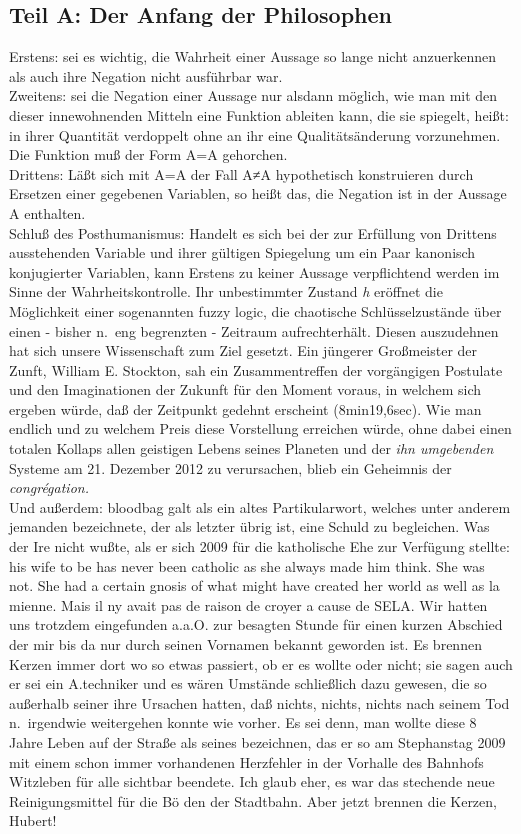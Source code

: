 \documentclass[
]{article}
\author{}
\date{\vspace{-2.5em}}
\begin{document}
\subsection{Teil A: Der Anfang der
Philosophen}\label{teil-a-der-anfang-der-philosophen}

Erstens: sei es wichtig, die Wahrheit einer Aussage so lange nicht
anzuerkennen als auch ihre Negation nicht ausführbar war.\\
Zweitens: sei die Negation einer Aussage nur alsdann möglich, wie man
mit den dieser innewohnenden Mitteln eine Funktion ableiten kann, die
sie spiegelt, heißt: in ihrer Quantität verdoppelt ohne an ihr eine
Qualitätsänderung vorzunehmen. Die Funktion muß der Form A=A
gehorchen.\\
Drittens: Läßt sich mit A=A der Fall A≠A hypothetisch konstruieren durch
Ersetzen einer gegebenen Variablen, so heißt das, die Negation ist in
der Aussage A enthalten.\\
Schluß des Posthumanismus: Handelt es sich bei der zur Erfüllung von
Drittens ausstehenden Variable und ihrer gültigen Spiegelung um ein Paar
kanonisch konjugierter Variablen, kann Erstens zu keiner Aussage
verpflichtend werden im Sinne der Wahrheitskontrolle. Ihr unbestimmter
Zustand \emph{h} eröffnet die Möglichkeit einer sogenannten fuzzy logic,
die chaotische Schlüsselzustände über einen - bisher n.~eng begrenzten -
Zeitraum aufrechterhält. Diesen auszudehnen hat sich unsere Wissenschaft
zum Ziel gesetzt. Ein jüngerer Großmeister der Zunft, William E.
Stockton, sah ein Zusammentreffen der vorgängigen Postulate und den
Imaginationen der Zukunft für den Moment voraus, in welchem sich ergeben
würde, daß der Zeitpunkt gedehnt erscheint (8min19,6sec). Wie man
endlich und zu welchem Preis diese Vorstellung erreichen würde, ohne
dabei einen totalen Kollaps allen geistigen Lebens seines Planeten und
der \emph{ihn umgebenden} Systeme am 21. Dezember 2012 zu verursachen,
blieb ein Geheimnis der \emph{congrégation.}\\
Und außerdem: bloodbag galt als ein altes Partikularwort, welches unter
anderem jemanden bezeichnete, der als letzter übrig ist, eine Schuld zu
begleichen. Was der Ire nicht wußte, als er sich 2009 für die
katholische Ehe zur Verfügung stellte: his wife to be has never been
catholic as she always made him think. She was not. She had a certain
gnosis of what might have created her world as well as la mienne. Mais
il n\textquotesingle y avait pas de raison de croyer a cause de SELA.
Wir hatten uns trotzdem eingefunden a.a.O. zur besagten Stunde für einen
kurzen Abschied der mir bis da nur durch seinen Vornamen bekannt
geworden ist. Es brennen Kerzen immer dort wo so etwas passiert, ob er
es wollte oder nicht; sie sagen auch er sei ein A.techniker und es wären
Umstände schließlich dazu gewesen, die so außerhalb seiner ihre Ursachen
hatten, daß nichts, nichts, nichts nach seinem Tod n.~irgendwie
weitergehen konnte wie vorher. Es sei denn, man wollte diese 8 Jahre
Leben auf der Straße als seines bezeichnen, das er so am Stephanstag
2009 mit einem schon immer vorhandenen Herzfehler in der Vorhalle des
Bahnhofs Witzleben für alle sichtbar beendete. Ich glaub eher, es war
das stechende neue Reinigungsmittel für die Bö den der Stadtbahn. Aber
jetzt brennen die Kerzen, Hubert!
\end{document}
